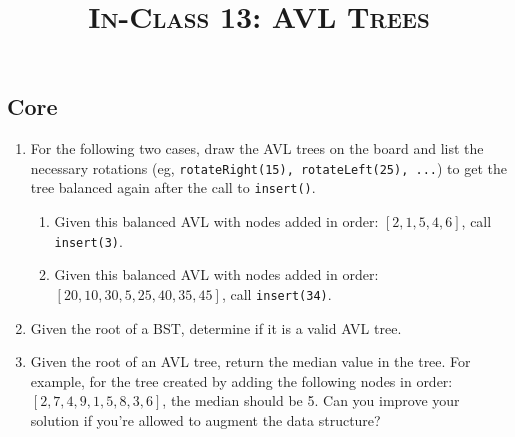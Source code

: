 \documentclass{article}
\title{\large{\textsc{In-Class 13: AVL Trees}}}
\date{}
\begin{document}
\maketitle

\subsection*{Core}


\begin{enumerate}






\item For the following two cases, draw the AVL trees on the board and list the necessary rotations (eg, \texttt{rotateRight(15), rotateLeft(25), ...}) to get the tree balanced again after the call to \texttt{insert()}.

\begin{enumerate}
    \item Given this balanced AVL with nodes added in order: $[2, 1, 5, 4, 6]$, call \texttt{insert(3)}.
    
    \item Given this balanced AVL with nodes added in order: $[20,10,30,5,25,40,35,45]$, call \texttt{insert(34)}.
\end{enumerate}


\item Given the root of a BST, determine if it is a valid AVL tree.


\item Given the root of an AVL tree, return the median value in the tree.  For example, for the tree created by adding the following nodes in order: $[2, 7, 4, 9, 1, 5, 8, 3, 6]$, the median should be 5. Can you improve your solution if you're allowed to augment the data structure?

\end{enumerate}
\end{document}
